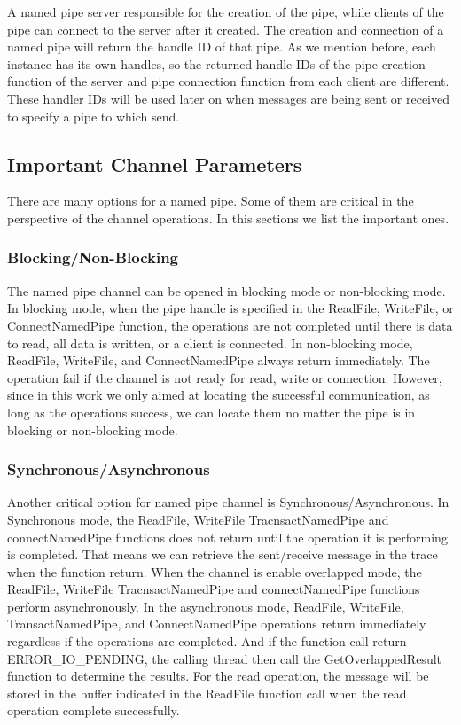 A named pipe server responsible for the creation of the pipe, while clients of the pipe can connect to the server after it created. The creation and connection of a named pipe will return the handle ID of that pipe. As we mention before, each instance has its own handles, so the returned handle IDs of the pipe creation function of the server and pipe connection function from each client are different. These handler IDs will be used later on when messages are being sent or received to specify a pipe to which send.

\subsection{Important Channel Parameters}
There are many options for a named pipe. Some of them are critical in the perspective of the channel operations. In this sections we list the important ones.

\subsubsection{Blocking/Non-Blocking}
The named pipe channel can be opened in blocking mode or non-blocking mode. In blocking mode, when the pipe handle is specified in the ReadFile, WriteFile, or ConnectNamedPipe function, the operations are not completed until there is data to read, all data is written, or a client is connected. In non-blocking mode, ReadFile, WriteFile, and ConnectNamedPipe always return immediately. The operation fail if the channel is not ready for read, write or connection. However, since in this work we only aimed at locating the successful communication, as long as the operations success, we can locate them no matter the pipe is in blocking or non-blocking mode.

\subsubsection{Synchronous/Asynchronous}
Another critical option for named pipe channel is Synchronous/Asynchronous. In Synchronous mode, the ReadFile, WriteFile TracnsactNamedPipe and connectNamedPipe functions does not return until the operation it is performing is completed. That means we can retrieve the sent/receive message in the trace when the function return. When the channel is enable overlapped mode, the ReadFile, WriteFile TracnsactNamedPipe and connectNamedPipe functions perform asynchronously. In the asynchronous mode, ReadFile, WriteFile, TransactNamedPipe, and ConnectNamedPipe operations return immediately regardless if the operations are completed. And if the function call return ERROR\_IO\_PENDING, the calling thread then call the GetOverlappedResult function to determine the results. For the read operation, the message will be stored in the buffer indicated in the ReadFile function call when the read operation complete successfully.

